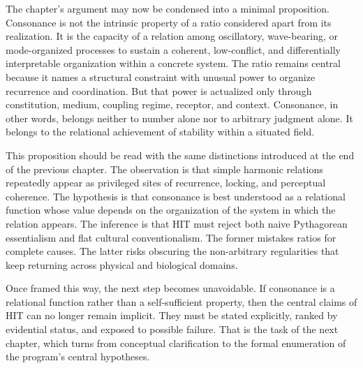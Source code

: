 The chapter's argument may now be condensed into a minimal proposition. Consonance is not the intrinsic property of a ratio considered apart from its realization. It is the capacity of a relation among oscillatory, wave-bearing, or mode-organized processes to sustain a coherent, low-conflict, and differentially interpretable organization within a concrete system. The ratio remains central because it names a structural constraint with unusual power to organize recurrence and coordination. But that power is actualized only through constitution, medium, coupling regime, receptor, and context. Consonance, in other words, belongs neither to number alone nor to arbitrary judgment alone. It belongs to the relational achievement of stability within a situated field.

This proposition should be read with the same distinctions introduced at the end of the previous chapter. The observation is that simple harmonic relations repeatedly appear as privileged sites of recurrence, locking, and perceptual coherence. The hypothesis is that consonance is best understood as a relational function whose value depends on the organization of the system in which the relation appears. The inference is that HIT must reject both naive Pythagorean essentialism and flat cultural conventionalism. The former mistakes ratios for complete causes. The latter risks obscuring the non-arbitrary regularities that keep returning across physical and biological domains.

Once framed this way, the next step becomes unavoidable. If consonance is a relational function rather than a self-sufficient property, then the central claims of HIT can no longer remain implicit. They must be stated explicitly, ranked by evidential status, and exposed to possible failure. That is the task of the next chapter, which turns from conceptual clarification to the formal enumeration of the program's central hypotheses.
